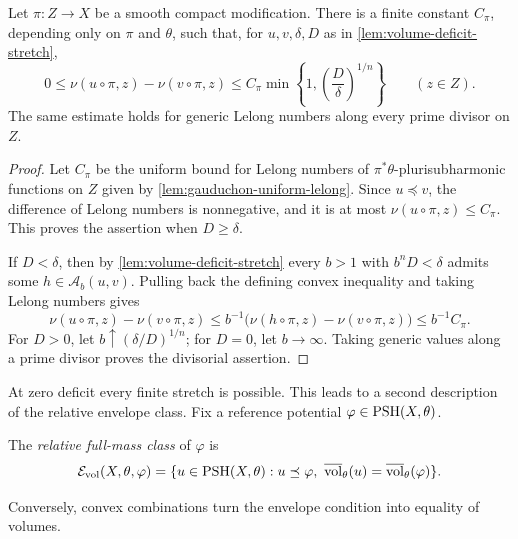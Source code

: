 \begin{proposition}\label{prop:volume-deficit-lelong}
Let $\pi\colon Z\to X$ be a smooth compact modification. There is a finite constant $C_\pi$, depending only on $\pi$ and $\theta$, such that, for $u,v,\delta,D$ as in \cref{lem:volume-deficit-stretch},
\[
 0\leq\nu(u\circ\pi,z)-\nu(v\circ\pi,z)
 \leq C_\pi\min\left\{1,\left(\frac D\delta\right)^{1/n}\right\}
 \qquad(z\in Z).
\]
The same estimate holds for generic Lelong numbers along every prime divisor on $Z$.
\end{proposition}
\begin{proof}
Let $C_\pi$ be the uniform bound for Lelong numbers of $\pi^*\theta$-plurisubharmonic functions on $Z$ given by \cref{lem:gauduchon-uniform-lelong}. Since $u\preceq v$, the difference of Lelong numbers is nonnegative, and it is at most $\nu(u\circ\pi,z)\leq C_\pi$. This proves the assertion when $D\geq\delta$.

If $D<\delta$, then by \cref{lem:volume-deficit-stretch} every $b>1$ with $b^nD<\delta$ admits some $h\in\mathcal A_b(u,v)$. Pulling back the defining convex inequality and taking Lelong numbers gives
\[
 \nu(u\circ\pi,z)-\nu(v\circ\pi,z)
 \leq b^{-1}\bigl(\nu(h\circ\pi,z)-\nu(v\circ\pi,z)\bigr)
 \leq b^{-1}C_\pi.
\]
For $D>0$, let $b\uparrow(\delta/D)^{1/n}$; for $D=0$, let $b\to\infty$. Taking generic values along a prime divisor proves the divisorial assertion.
\end{proof}

At zero deficit every finite stretch is possible. This leads to a second description of the relative envelope class. Fix a reference potential $\varphi\in\mathrm{PSH}(X,\theta)$.

\begin{definition}\label{def:relative-volume-class}
The \emph{relative full-mass class} of $\varphi$ is
\[
 \mathcal E_{\mathrm{vol}}(X,\theta,\varphi)
 =\{u\in\mathrm{PSH}(X,\theta):u\preceq\varphi,
 \ \overline{\operatorname{vol}}_\theta(u)
   =\overline{\operatorname{vol}}_\theta(\varphi)\}.
\]
\end{definition}

Conversely, convex combinations turn the envelope condition into equality of volumes.


